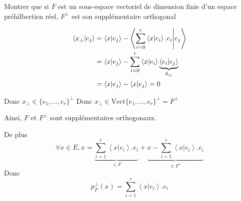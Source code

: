 \documentclass{article}
\renewenvironment{question_kholle}[2][ ]
{
	\subsection{\texorpdfstring{#2}{}}
	\notblank{#1}
	{
		\noindent #1
		\bigbreak
	}
	{}
	\begin{proof}
}
{
	\end{proof}
}
\begin{document}
\begin{question_kholle}{Montrer que si $F$ est un sous-espace vectoriel de dimension finie d'un espace préhilbertien réel, $F^{\perp}$ est son supplémentaire orthogonal}
\begin{itemize}[label=$\lozenge$]
\begin{itemize}[label=$\star$]
			\begin{align*}
				\braket{ x_{\perp} | e_{j} } &= \braket{ x | e_{j} }  - \left\langle  \sum_{i=0}^{r}\braket{ x | e_{i} } .e_{i} \Bigg|  e_{j} \right\rangle \\
				&= \left\langle x | e_{j} \right\rangle - \sum_{i=0}^{r} \left\langle x | e_{i} \right\rangle\underbrace{  \left\langle e_{i} | e_{j} \right\rangle  }_{ \delta_{ij} } \\
				&= \left\langle x | e_{j} \right\rangle  - \left\langle x | e_{j} \right\rangle  = 0
			\end{align*}
			
			
			Donc $x_{\perp} \in \{e_{1}, \dots, e_{r}\}^{\perp}$
			Donc $x_{\perp} \in \text{Vect}\{ e_{1}, \dots, e_{r} \}^{\perp} = F^{\perp}$
			
		\end{itemize}
	\end{itemize}
	Ainsi, $F$ et $F^{\perp}$ sont supplémentaires orthogonaux.
	
	De plus
	$$	\forall x \in E, x = \underbrace{ \sum_{i=1}^{r}\left\langle x | e_{i} \right\rangle .e_{i} }_{ \in F } + \underbrace{x - \sum_{i=1}^{r}\left\langle x | e_{i} \right\rangle .e_{i}  }_{ \in F^{\perp} }$$
	Donc $$p_{F}^{\perp}(x) = \sum_{i=1}^{r}\left\langle x | e_{i} \right\rangle .e_{i} $$
	
\end{question_kholle}
\end{document}
